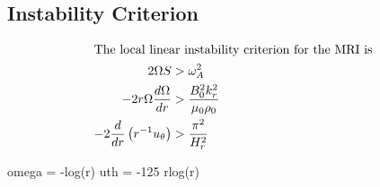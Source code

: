 \documentclass[10pt]{article}
\renewcommand{\vec}[1]{\boldsymbol{#1}}
\newcommand{\grad}{\vec{\nabla}}
\begin{document}
\subsection{Instability Criterion}
\begin{align*}
  \intertext{The local linear instability criterion for the MRI is}
  2\Omega S &> \omega_A^2 \\
  -2r\Omega\frac{d\Omega}{dr}  &> \frac{B_0^2k_r^2}{\mu_0\rho_0} \\
  -2\frac{d}{dr}\left( r^{-1}u_{\theta} \right)  &> \frac{\pi^2}{H_r^2} \\
\end{align*}

omega = -log(r)
uth = -125 rlog(r)



\end{document}
